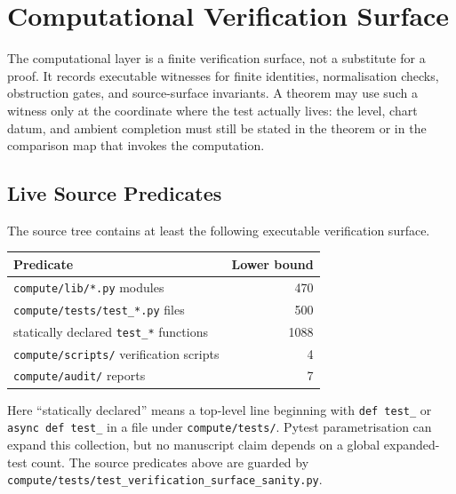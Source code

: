 \chapter{Computational Verification Surface}
\label{app:engines}
\label{app:verification-surface}

\newcommand{\VerificationSurfaceEngineLowerBound}{470}
\newcommand{\VerificationSurfaceTestFileLowerBound}{500}
\newcommand{\VerificationSurfaceStaticTestLowerBound}{1088}
\newcommand{\VerificationSurfaceScriptLowerBound}{4}
\newcommand{\VerificationSurfaceAuditLowerBound}{7}

The computational layer is a finite verification surface, not a
substitute for a proof.  It records executable witnesses for finite
identities, normalisation checks, obstruction gates, and source-surface
invariants.  A theorem may use such a witness only at the coordinate
where the test actually lives: the level, chart datum, and ambient
completion must still be stated in the theorem or in the comparison
map that invokes the computation.

\section{Live Source Predicates}
\label{sec:verification-source-predicates}

The source tree contains at least the following executable verification
surface.
\begin{center}
\begin{tabular}{@{}lr@{}}
\toprule
\textbf{Predicate} & \textbf{Lower bound} \\
\midrule
\texttt{compute/lib/*.py} modules &
\VerificationSurfaceEngineLowerBound \\
\texttt{compute/tests/test\_*.py} files &
\VerificationSurfaceTestFileLowerBound \\
statically declared \texttt{test\_*} functions &
\VerificationSurfaceStaticTestLowerBound \\
\texttt{compute/scripts/} verification scripts &
\VerificationSurfaceScriptLowerBound \\
\texttt{compute/audit/} reports &
\VerificationSurfaceAuditLowerBound \\
\bottomrule
\end{tabular}
\end{center}
Here ``statically declared'' means a top-level line beginning with
\texttt{def test\_} or \texttt{async def test\_} in a file under
\texttt{compute/tests/}.  Pytest parametrisation can expand this
collection, but no manuscript claim depends on a global expanded-test
count.  The source predicates above are guarded by
\texttt{compute/tests/test\_verification\_surface\_sanity.py}.

